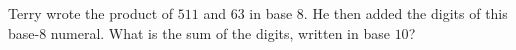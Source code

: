 Terry wrote the product of $511$ and $63$ in base $8$. He then added the digits of this base-$8$ numeral. What is the sum of the digits, written in base $10$?
